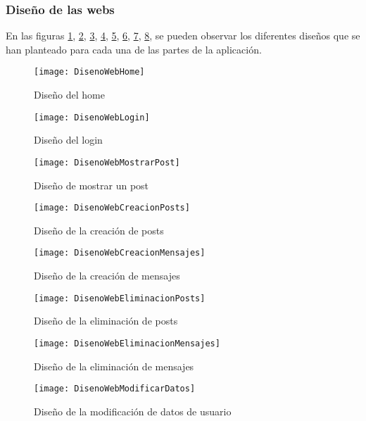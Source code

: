 \documentclass[a4paper]{article}
\begin{document}
	\subsubsection{Diseño de las webs}
	En las figuras \ref{home}, \ref{login}, \ref{mostrar post}, \ref{crear post}, \ref{mensaje}, \ref{borrarPost}, \ref{borrarMensaje}, \ref{modificarDatos}, se pueden observar los diferentes diseños que se han planteado para cada una de las partes de la aplicación.
	\begin{figure}[htb]
		\texttt{[image: DisenoWebHome]}
		\caption{Diseño del home}
		\label{home}
	\end{figure}
	\begin{figure}[htb]
		\texttt{[image: DisenoWebLogin]}
		\caption{Diseño del login}
		\label{login}
	\end{figure}
	\begin{figure}[htb]
		\texttt{[image: DisenoWebMostrarPost]}
		\caption{Diseño de mostrar un post}
		\label{mostrar post}
	\end{figure}
	\begin{figure}[htb]
		\texttt{[image: DisenoWebCreacionPosts]}
		\caption{Diseño de la creación de posts}
		\label{crear post}
	\end{figure}
	\begin{figure}[htb]
		\texttt{[image: DisenoWebCreacionMensajes]}
		\caption{Diseño de la creación de mensajes}
		\label{mensaje}
	\end{figure}
	\begin{figure}[htb]
		\texttt{[image: DisenoWebEliminacionPosts]}
		\caption{Diseño de la eliminación de posts}
		\label{borrarPost}
	\end{figure}
	\begin{figure}[htb]
		\texttt{[image: DisenoWebEliminacionMensajes]}
		\caption{Diseño de la eliminación de mensajes}
		\label{borrarMensaje}
	\end{figure}
	\begin{figure}[htb]
		\texttt{[image: DisenoWebModificarDatos]}
		\caption{Diseño de la modificación de datos de usuario}
		\label{modificarDatos}
	\end{figure}
	
\end{document}
